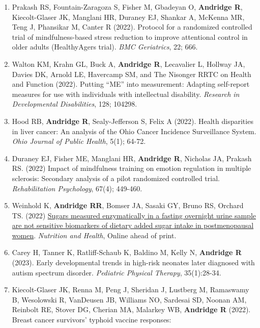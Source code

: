 \documentclass[
  english,
  letterpaper,
  DIV=11,
  numbers=noendperiod]{scrartcl}
\begin{document}
\begin{enumerate}
  Fisher ME, Duraney EJ, Friess K, Whitmoyer P, \textbf{Andridge R},
  Prakash P (2022). Trait mindfulness and emotion regulation
  responsiveness to negative affect in daily life. \emph{Mindfulness},
  13; 2796-2811.
\item
  Prakash RS, Fountain-Zaragoza S, Fisher M, Gbadeyan O,
  \textbf{Andridge R}, Kiecolt-Glaser JK, Manglani HR, Duraney EJ,
  Shankar A, McKenna MR, Teng J, Phansikar M, Canter R (2022). Protocol
  for a randomized controlled trial of mindfulness-based stress
  reduction to improve attentional control in older adults (HealthyAgers
  trial). \emph{BMC Geriatrics}, 22; 666.
\item
  Walton KM, Krahn GL, Buck A, \textbf{Andridge R}, Lecavalier L,
  Hollway JA, Davies DK, Arnold LE, Havercamp SM, and The Nisonger RRTC
  on Health and Function (2022). Putting ``ME'' into measurement:
  Adapting self-report measures for use with individuals with
  intellectual disability. \emph{Research in Developmental
  Disabilities}, 128; 104298.
\item
  Hood RB, \textbf{Andridge R}, Sealy-Jefferson S, Felix A (2022).
  Health disparities in liver cancer: An analysis of the Ohio Cancer
  Incidence Surveillance System. \emph{Ohio Journal of Public Health},
  5(1); 64-72.
\item
  Duraney EJ, Fisher ME, Manglani HR, \textbf{Andridge R}, Nicholas JA,
  Prakash RS. (2022) Impact of mindfulness training on emotion
  regulation in multiple sclerosis: Secondary analysis of a pilot
  randomized controlled trial. \emph{Rehabilitation Psychology}, 67(4);
  449-460.
\item
  Weinhold K, \textbf{Andridge RR}, Bomser JA, Sasaki GY, Bruno RS,
  Orchard TS. (2022)
  \href{https://doi.org/10.1177/02601060221106819}{Sugars measured
  enzymatically in a fasting overnight urine sample are not sensitive
  biomarkers of dietary added sugar intake in postmenopausal women}.
  \emph{Nutrition and Health}, Online ahead of print.
\item
  Carey H, Tanner K, Ratliff-Schaub K, Baldino M, Kelly N,
  \textbf{Andridge R} (2023). Early developmental trends in high-risk
  neonates later diagnosed with autism spectrum disorder.
  \emph{Pediatric Physical Therapy}, 35(1):28-34.
\item
  Kiecolt-Glaser JK, Renna M, Peng J, Sheridan J, Lustberg M, Ramaswamy
  B, Wesolowski R, VanDeusen JB, Williams NO, Sardesai SD, Noonan AM,
  Reinbolt RE, Stover DG, Cherian MA, Malarkey WB, \textbf{Andridge R}
  (2022). Breast cancer survivors' typhoid vaccine responses:

\end{enumerate}
\end{document}
